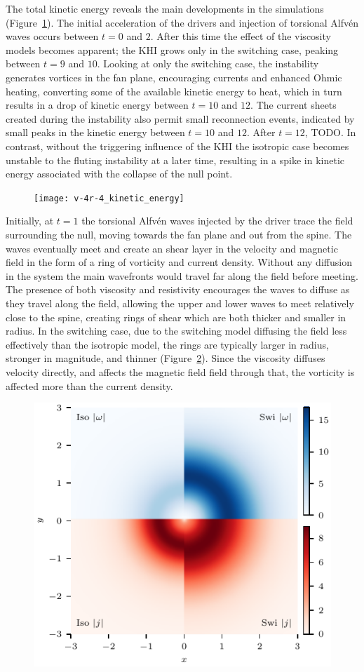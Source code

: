 The total kinetic energy reveals the main developments in the simulations (Figure~\ref{fig:v-4r-4_kinetic_energy}). The initial acceleration of the drivers and injection of torsional Alfv\'en waves occurs between $t=0$ and $2$. After this time the effect of the viscosity models becomes apparent; the KHI grows only in the switching case, peaking between $t=9$ and $10$. Looking at only the switching case, the instability generates vortices in the fan plane, encouraging currents and enhanced Ohmic heating, converting some of the available kinetic energy to heat, which in turn results in a drop of kinetic energy between $t=10$ and $12$. The current sheets created during the instability also permit small reconnection events, indicated by small peaks in the kinetic energy between $t=10$ and $12$. After $t=12$, TODO. In contrast, without the triggering influence of the KHI the isotropic case becomes unstable to the fluting instability at a later time, resulting in a spike in kinetic energy associated with the collapse of the null point.

\begin{figure}[t]
  \centering
  \texttt{[image: v-4r-4\_kinetic\_energy]}
  \caption{}%
  \label{fig:v-4r-4_kinetic_energy}
\end{figure}

Initially, at $t=1$ the torsional Alfv\'en waves injected by the driver trace the field surrounding the null, moving towards the fan plane and out from the spine. The waves eventually meet and create an shear layer in the velocity and magnetic field in the form of a ring of vorticity and current density. Without any diffusion in the system the main wavefronts would travel far along the field before meeting. The presence of both viscosity and resistivity encourages the waves to diffuse as they travel along the field, allowing the upper and lower waves to meet relatively close to the spine, creating rings of shear which are both thicker and smaller in radius. In the switching case, due to the switching model diffusing the field less effectively than the isotropic model, the rings are typically larger in radius, stronger in magnitude, and thinner (Figure~\ref{fig:v-4r-4_vorticity_current_ring_t_3}). Since the viscosity diffuses velocity directly, and affects the magnetic field field through that, the vorticity is affected more than the current density.

\begin{figure}[t]
  \centering
  \includegraphics[width=0.48\linewidth]{v-4r-4_vorticity_current_ring_t_3}
  \caption{}%
  \label{fig:v-4r-4_vorticity_current_ring_t_3}
\end{figure}

